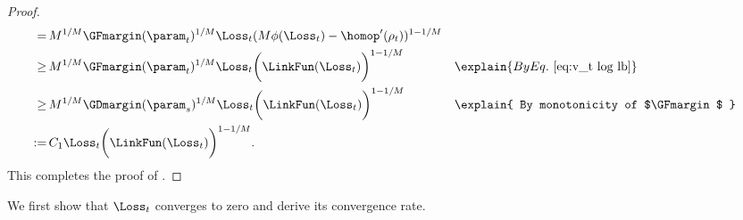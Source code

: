 \begin{proof}
\begin{align*}
    = \, & M^{1/M} \GFmargin (\param_t)^{1/M} \Loss_t (M \phi(\Loss_t) - \homop^\prime (\rho_t))^{1-1/M}\\ 
    \ge \, & M^{1/M} \GFmargin (\param_t)^{1/M} \Loss_t \bigg(\LinkFun(\Loss_t)\bigg)^{1 - 1/M} &&\explain{ By Eq.~\Cref{eq:v_t log lb} } \\ 
    \ge \, & M^{1/M} \GDmargin (\param_s)^{1/M} \Loss_t \bigg(\LinkFun(\Loss_t)\bigg)^{1 - 1/M} &&\explain{ By monotonicity of $\GFmargin$ }\\ 
    := \, & C_1 \Loss_t \bigg(\LinkFun(\Loss_t)\bigg)^{1 - 1/M}. 
\end{align*}
This completes the proof of .
\end{proof}

We first show that $\Loss_t$ converges to zero and derive its convergence rate.


